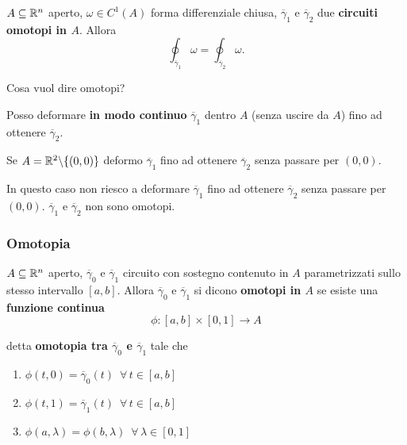 \begin{theorem}
	$A \subseteq \mathbb{R}^n$ aperto, $\omega \in C^1(A)$ forma differenziale chiusa, $\overline{\gamma}_1$ e $\overline{\gamma}_2$ due \textbf{circuiti omotopi in $A$}. Allora
	\begin{equation*}
		\oint_{\overline{\gamma}_1}\omega=\oint_{\overline{\gamma}_2}\omega.
	\end{equation*}
	
	Cosa vuol dire omotopi?
	
	Posso deformare \textbf{in modo continuo} $\overline{\gamma}_1$ dentro $A$ (senza uscire da $A$) fino ad ottenere $\overline{\gamma}_2$.
	
	\segnaposto %
	
	Se $A=\mathbb{R}^2\backslash\{(0,0)\}$ deformo $\overline{\gamma}_1$ fino ad ottenere $\overline{\gamma}_2$ senza passare per $(0,0)$.
	
	\segnaposto %
	
	In questo caso non riesco a deformare $\overline{\gamma}_1$ fino ad ottenere $\overline{\gamma}_2$ senza passare per $(0,0)$. $\overline{\gamma}_1$ e $\overline{\gamma}_2$ non sono omotopi. 	
\end{theorem}


\subsubsection{Omotopia}
\begin{definition}
	$A \subseteq \mathbb{R}^n$ aperto, $\overline{\gamma}_0$ e $\overline{\gamma}_1$ circuito con sostegno contenuto in $A$ parametrizzati sullo stesso intervallo $[a,b]$. Allora $\overline{\gamma}_0$ e $\overline{\gamma}_1$ si dicono \textbf{omotopi in $A$} se esiste una \textbf{funzione continua}
	\begin{equation*}
		\phi: [a,b]\times [0,1]\rightarrow A
	\end{equation*}
	
	detta \textbf{omotopia tra $\overline{\gamma}_0$ e $\overline{\gamma}_1$} tale che
	\begin{enumerate}
		\item $\phi(t,0)=\overline{\gamma}_0(t)\,\,\, \forall\, t \in [a,b]$
		\item $\phi(t,1)=\overline{\gamma}_1(t)\,\,\, \forall\, t \in [a,b]$
		\item $\phi(a,\lambda)=\phi(b,\lambda)\,\,\, \forall \, \lambda \in[0,1]$
	\end{enumerate}
\end{definition}
	

